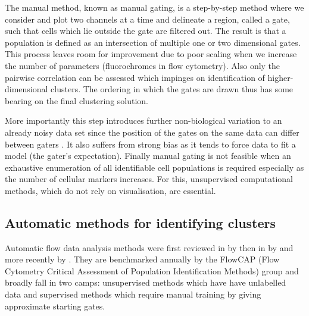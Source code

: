 The manual method, known as manual gating,
is a step-by-step method where we consider and plot two channels at a time and delineate a region, called a gate, such that cells which lie outside the gate are filtered out.
The result is that a population is defined as an intersection of multiple one or two dimensional gates.
This process leaves room for improvement due to poor scaling when we increase the number of parameters (fluorochromes in flow cytometry).
Also only the pairwise correlation can be assessed which impinges
on identification of higher-dimensional clusters.
The ordering in which the gates are drawn thus has some bearing on the final clustering solution.

More importantly this step introduces further non-biological variation to an already noisy data set since the position of the gates
on the same data can differ between gaters \citep{Maecker:2010fg}.
It also suffers from strong bias as it tends to force data to fit a model (the gater's expectation).
Finally manual gating is not feasible when an exhaustive enumeration of all identifiable cell populations is required \citep{Siebert:2010iv,Aghaeepour:2012fq} especially
as the number of cellular markers increases.
For this, unsupervised computational methods, which do not rely on visualisation, are essential.


\subsection{Automatic methods for identifying clusters}

Automatic flow data analysis methods were first reviewed in \citeyear{Bashashati:2009em} by \citeauthor{Bashashati:2009em} then in \citeyear{Lugli:2010ki} by \citeauthor{Lugli:2010ki}
and more recently by \citet{Aghaeepour:2013dg}.
They are benchmarked annually by the FlowCAP (Flow Cytometry Critical Assessment of Population Identification Methods)
group and broadly fall in two camps:
unsupervised methods which have have unlabelled data
and
supervised methods which require manual training by giving approximate starting gates.

